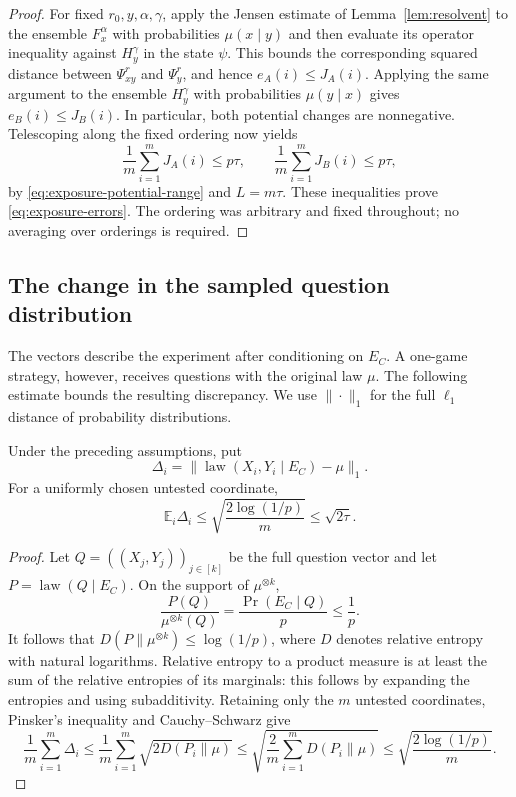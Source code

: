 \begin{proof}
For fixed $r_0,y,\alpha,\gamma$, apply the Jensen estimate of
Lemma~\ref{lem:resolvent} to the ensemble $F_x^\alpha$ with probabilities
$\mu(x\mid y)$ and then evaluate its operator inequality against
$H_y^\gamma$ in the state $\psi$. This bounds the corresponding
squared distance between $\Psi_{xy}^r$ and $\Psi_y^r$, and hence
$e_A(i)\le J_A(i)$. Applying the same argument to the ensemble
$H_y^\gamma$ with probabilities $\mu(y\mid x)$ gives
$e_B(i)\le J_B(i)$. In particular, both potential changes are
nonnegative. Telescoping along the fixed ordering now yields
\begin{equation}\label{eq:exposure-telescope}
 \frac1m\sum_{i=1}^mJ_A(i)\le p\tau,\qquad
 \frac1m\sum_{i=1}^mJ_B(i)\le p\tau,
\end{equation}
by \eqref{eq:exposure-potential-range} and $L=m\tau$.
These inequalities prove \eqref{eq:exposure-errors}. The ordering was
arbitrary and fixed throughout; no averaging over orderings is required.
\end{proof}

\subsection{The change in the sampled question distribution}

The vectors describe the experiment after conditioning on $E_C$.
A one-game strategy, however, receives questions with the original law
$\mu$. The following estimate bounds the resulting discrepancy. We use
$\|\cdot\|_1$ for the full $\ell_1$ distance of probability distributions.

\begin{lemma}\label{lem:question-drift}
Under the preceding assumptions, put
\[
 \Delta_i=\|\operatorname{law}(X_i,Y_i\mid E_C)-\mu\|_1.
\]
For a uniformly chosen untested coordinate,
\[
 \mathbb E_i\Delta_i
 \le\sqrt{\frac{2\log(1/p)}{m}}\le\sqrt{2\tau}.
\]
\end{lemma}
\begin{proof}
Let $Q=((X_j,Y_j))_{j\in[k]}$ be the full question vector and let
$P=\operatorname{law}(Q\mid E_C)$. On the support of $\mu^{\otimes k}$,
\[
 \frac{P(Q)}{\mu^{\otimes k}(Q)}
   =\frac{\Pr(E_C\mid Q)}p\le\frac1p.
\]
It follows that $D(P\|\mu^{\otimes k})\le\log(1/p)$, where $D$ denotes
relative entropy with natural logarithms. Relative entropy to a product
measure is at least the sum of the relative entropies of its marginals:
this follows by expanding the entropies and using subadditivity.
Retaining only the $m$ untested coordinates, Pinsker's inequality and
Cauchy--Schwarz give
\[
 \frac1m\sum_{i=1}^m\Delta_i
 \le \frac1m\sum_{i=1}^m
       \sqrt{2D(P_i\|\mu)}
 \le\sqrt{\frac2m\sum_{i=1}^mD(P_i\|\mu)}
 \le\sqrt{\frac{2\log(1/p)}m}.
\]
\end{proof}
